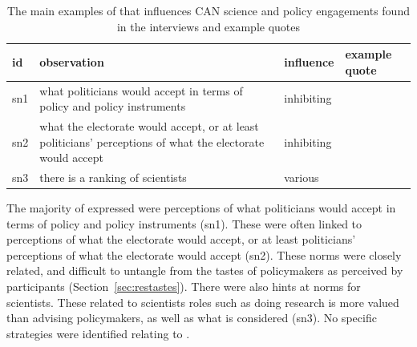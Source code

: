 \subsubsection{\ismsn}\label{sec:resnorms}

\begin{table}[!ht]
\footnotesize
\caption{The main examples of \ismsn{} that influences CAN science and policy engagements found in the interviews and example quotes}\label{tab:resnorms}
\begin{tabular}{L{.06\linewidth}L{.3\linewidth}L{.12\linewidth}L{.52\linewidth}} \hline
\textbf{id} & \textbf{observation} & \textbf{influence} & \textbf{example quote} \\ \hline \hline 
sn1 & what politicians would accept in terms of policy and policy instruments & inhibiting &  \\[5mm]
sn2 & what the electorate would accept, or at least politicians' perceptions of what the electorate would accept & inhibiting &  \\[5mm]
sn3 & there is a ranking of scientists
 & various &  \\[5mm]
 \hline
\end{tabular}
\end{table}

The majority of \ismsn{} expressed were perceptions of what politicians would accept in terms of policy and policy instruments (sn1). These were often linked to perceptions of what the electorate would accept, or at least politicians' perceptions of what the electorate would accept (sn2). These norms were closely related, and difficult to untangle from the tastes of policymakers as perceived by participants (Section~\ref{sec:restastes}). There were also hints at norms for scientists. These related to scientists roles such as doing research is more valued than advising policymakers, as well as what is considered  (sn3). No specific strategies were identified relating to \ismsn.


